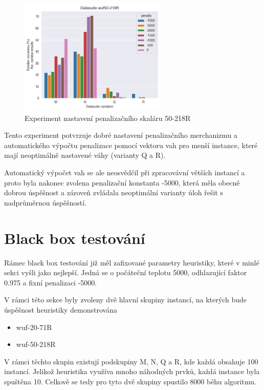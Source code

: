 \documentclass[twoside,twocolumn]{article}
\begin{document}
    \begin{figure}
        \centering
        \includegraphics[width=7cm]{images/testing/penalty/wuf50-218R}
        \caption{Experiment nastavení penalizačního skaláru 50-218R}
        \label{fig:penalty_218}
    \end{figure}

    Tento experiment potvrzuje dobré nastavení penalizačního merchanizmu a automatického výpočtu penalizace pomocí vektoru vah
    pro menší instance, které mají neoptimálně nastavené váhy (varianty Q a R).

    Automatický výpočet vah se ale neosvědčil při zpracovávní větších instancí a proto byla nakonec zvolena penalizační
    konstanta -5000, která měla obecně dobrou úspěšnost a zároveň zvládala neoptimální varianty úloh řešit s nadprůměrnou úspěšností.


    \section{Black box testování}

    Rámec black box testování již měl zafixované parametry heuristiky, které v minlé sekci vyšli jako nejlepší.
    Jedná se o počáteční teplotu 5000, odhlazující faktor 0.975 a fixní penalizaci -5000.

    V rámci této sekce byly zvoleny dvě hlavní skupiny instancí, na kterých bude úspěšnost heuristiky demonstrována

    \begin{itemize}
        \item wuf-20-71R
        \item wuf-50-218R
    \end{itemize}

    V rámci těchto skupin existují podskupiny M, N, Q a R, kde každá obsahuje 100 instancí.
    Jelikož heuristika využíva mnoho náhodných prvků, každá instance byla spuštěna 10.
    Celkově se tedy pro tyto dvě skupiny spustilo 8000 běhu algoritmu.
\end{document}
